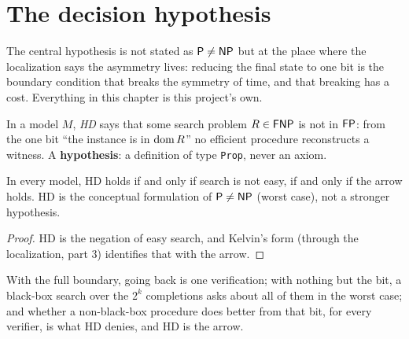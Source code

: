 \chapter{The decision hypothesis}
\label{chap:decision}

The central hypothesis is not stated as $\mathsf{P} \neq \mathsf{NP}$ but at the place where the localization
says the asymmetry lives: reducing the final state to one bit is the boundary condition that breaks
the symmetry of time, and that breaking has a cost. Everything in this chapter is this project's
own.

\begin{definition}
  \label{def:hd}
  \leanok
  In a model $M$, \emph{HD} says that some search problem $R \in \mathsf{FNP}$ is not in $\mathsf{FP}$: from the
  one bit ``the instance is in $\operatorname{dom} R$'' no efficient procedure reconstructs a witness. A
  \textbf{hypothesis}: a definition of type \texttt{Prop}, never an axiom.
  \own{}
\end{definition}

\begin{theorem}
  \label{thm:hd-iff-arrow}
  \leanok
  In every model, HD holds if and only if search is not easy, if and only if the arrow holds. HD is
  the conceptual formulation of $\mathsf{P} \neq \mathsf{NP}$ (worst case), not a stronger hypothesis.
  \own{}
\end{theorem}

\begin{proof}
  \leanok
  HD is the negation of easy search, and Kelvin's form (through the localization, part 3) identifies
  that with the arrow.
\end{proof}

\begin{theorem}
  \label{thm:hd-boundary}
  \leanok
  With the full boundary, going back is one verification; with nothing but the bit, a black-box
  search over the $2^k$ completions asks about all of them in the worst case; and whether a
  non-black-box procedure does better from that bit, for every verifier, is what HD denies, and HD
  is the arrow.
  \own{}
\end{theorem}

